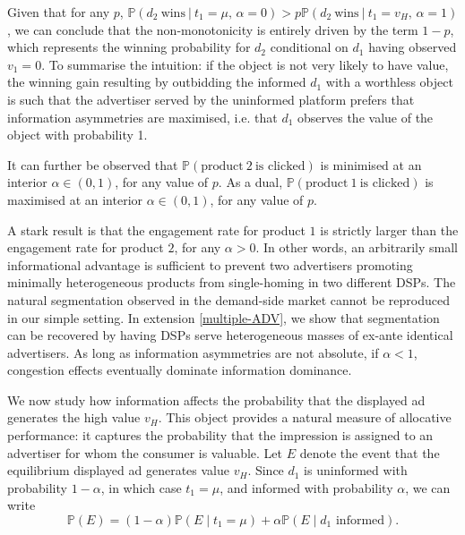 \noindent Given that for any $p$, $\mathbb{P}(d_2 \ \textrm{wins} \ | \ t_1 = \mu, \, \alpha = 0)>p \mathbb{P}(d_2 \ \textrm{wins} \ | \ t_1 = v_H, \, \alpha = 1)$, we can conclude that the non-monotonicity is entirely driven by the term $1-p$, which represents the winning probability for $d_2$ conditional on $d_1$ having observed $v_1 = 0$. To summarise the intuition: if the object is not very likely to have value, the winning gain resulting by outbidding the informed $d_1$ with a worthless object is such that the advertiser served by the uninformed platform prefers that information asymmetries are maximised, i.e. that $d_1$ observes the value of the object with probability 1. \par

\noindent It can further be observed that $\mathbb{P}(\text{product} \ 2 \ \text{is clicked})$ is minimised at an interior $\alpha \in (0,1)$, for any value of $p$. As a dual, $\mathbb{P}(\text{product} \ 1 \ \text{is clicked})$ is maximised at an interior $\alpha \in (0,1)$, for any value of $p$.  \par

\noindent A stark result is that the engagement rate for product $1$ is strictly larger than the engagement rate for product $2$, for any $\alpha > 0$. In other words, an arbitrarily small informational advantage is sufficient to prevent two advertisers promoting minimally heterogeneous products from single-homing in two different DSPs. The natural segmentation observed in the demand-side market cannot be reproduced in our simple setting. In extension \ref{multiple-ADV}, we show that segmentation can be recovered by having DSPs serve heterogeneous masses of ex-ante identical advertisers. As long as information asymmetries are not absolute, if $\alpha < 1$, congestion effects eventually dominate information dominance.

We now study how information affects the probability that the displayed ad generates the high value $ v_H $. This object provides a natural measure of allocative performance: it captures the probability that the impression is assigned to an advertiser for whom the consumer is valuable. Let $ E $ denote the event that the equilibrium displayed ad generates value $ v_H $. Since $ d_1 $ is uninformed with probability $ 1-\alpha $, in which case $ t_1 = \mu $, and informed with probability $ \alpha $, we can write
\begin{equation}\label{HP}\tag{HP}
\mathbb{P}(E)
=
(1 - \alpha)\mathbb{P}(E \mid t_1 = \mu)
+
\alpha \mathbb{P}(E \mid d_1 \text{ informed}).
\end{equation}

